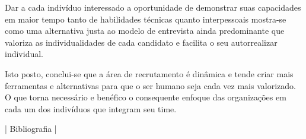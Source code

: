 \documentclass[12pt]{article}
\begin{document}
Dar a cada indivíduo interessado a oportunidade de demonstrar suas capacidades em maior tempo tanto de habilidades técnicas quanto interpessoais mostra-se como uma alternativa justa ao modelo de entrevista ainda predominante que valoriza as individualidades de cada candidato e facilita o seu autorrealizar individual. 

Isto posto, conclui-se que a área de recrutamento é dinâmica e tende criar mais ferramentas e alternativas para que o ser humano seja cada vez mais valorizado. O que torna necessário e benéfico o consequente enfoque das organizações em cada um dos indivíduos que integram seu time. 

| Bibliografia |
\end{document}
